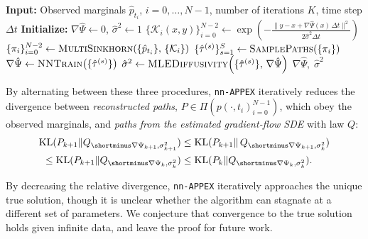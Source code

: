 \documentclass[twoside]{article}
\newcommand{\nappex}{\texttt{nn-APPEX}}
\begin{document}
\begin{algorithm}
\caption{\nappex{}}
\begin{algorithmic}[1]
\State \textbf{Input:} Observed marginals $\hat{p}_{t_i}$, $i = 0, \ldots, N-1$, number of iterations $K$, time step $\Delta t$
\State \textbf{Initialize:} $\nabla\hat{\Psi} \gets 0$,\; $\hat{\sigma}^2 \gets 1$
    \State $\{\mathcal{K}_i(x,y)\}_{i=0}^{N-2} \gets \exp\!\left(-\frac{\|y - x + \nabla\hat{\Psi}(x)\,\Delta t\|^2}{ 2\hat{\sigma}^2\Delta t}\right)$
\State $\{\pi_i\}_{i=0}^{N-2}  \gets \textsc{MultiSinkhorn}\!\left(\{\hat{p}_{t_i}\},\, \{\mathcal{K}_i\}\right)$
\vspace{0.5em}
\State $\{\hat{\tau}^{(s)}\}_{s=1}^S \gets \textsc{SamplePaths}\!\left(\{\pi_i\}\right)$
\vspace{0.5em}
    \State $\nabla\hat{\Psi} \gets \textsc{NNTrain}\!\left(\{\hat{\tau}^{(s)}\}\right)$
    \State $\hat{\sigma}^2 \gets \textsc{MLEDiffusivity}\!\left(\{\hat{\tau}^{(s)}\},\, \nabla\hat{\Psi}\right)$
\EndFor
\State \Return $\nabla\hat{\Psi},\; \hat{\sigma}^2$
\end{algorithmic}
\label{alg:nappex}
\end{algorithm}

By alternating between these three procedures, \nappex{} iteratively reduces the divergence between \emph{reconstructed paths}, $P \in \Pi\left(p(\cdot, t_i)_{i=0}^{N-1}\right)$, which obey the observed marginals, and \emph{paths from the estimated gradient-flow SDE} with law $Q$:
\begin{align}
\mathrm{KL}(P_{k+1}\|Q_{\shortminus\nabla\Psi_{k+1}, \sigma^2_{k+1}}) &\le \mathrm{KL}(P_{k+1}\|\,Q_{\shortminus\nabla\Psi_{k+1}, \sigma^2_{k}}) \notag \\
\le \mathrm{KL}(P_{k+1}\|Q_{\shortminus\nabla\Psi_{k}, \sigma^2_{k}}) &\le \mathrm{KL}(P_{k}\|Q_{\shortminus\nabla\Psi_{k}, \sigma^2_{k}}). 
\label{eq: appex_decrease_KL}
\end{align}

By decreasing the relative divergence, \nappex{} iteratively approaches the unique true solution, though it is unclear whether the algorithm can stagnate at a different set of parameters. We conjecture that convergence to the true solution holds given infinite data, and leave the proof for future work. 
\end{document}
